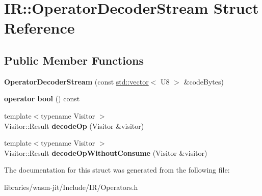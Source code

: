 \hypertarget{struct_i_r_1_1_operator_decoder_stream}{}\section{IR\+:\+:Operator\+Decoder\+Stream Struct Reference}
\label{struct_i_r_1_1_operator_decoder_stream}
\subsection*{Public Member Functions}
\begin{DoxyCompactItemize}
\item 
\mbox{\label{struct_i_r_1_1_operator_decoder_stream_a2408751c97a2f3643b36f8d2fea4e541}} 
{\bfseries Operator\+Decoder\+Stream} (const \mbox{\hyperlink{classstd_1_1vector}{std\+::vector}}$<$ U8 $>$ \&code\+Bytes)
\item 
\mbox{\label{struct_i_r_1_1_operator_decoder_stream_a863e05862d2e4c19136c04eb73a7fa84}} 
{\bfseries operator bool} () const
\item 
\mbox{\label{struct_i_r_1_1_operator_decoder_stream_a7b680638c09ef51617652259c47bd7db}} 
{\footnotesize template$<$typename Visitor $>$ }\\Visitor\+::\+Result {\bfseries decode\+Op} (Visitor \&visitor)
\item 
\mbox{\label{struct_i_r_1_1_operator_decoder_stream_a6b57501a0b3ca612c59e2c15ddc2edd5}} 
{\footnotesize template$<$typename Visitor $>$ }\\Visitor\+::\+Result {\bfseries decode\+Op\+Without\+Consume} (Visitor \&visitor)
\end{DoxyCompactItemize}


The documentation for this struct was generated from the following file\+:\begin{DoxyCompactItemize}
\item 
libraries/wasm-\/jit/\+Include/\+I\+R/Operators.\+h\end{DoxyCompactItemize}
